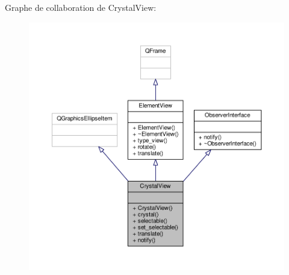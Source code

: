 Graphe de collaboration de Crystal\+View\+:
\nopagebreak
\begin{figure}[H]
\begin{center}
\leavevmode
\includegraphics[width=350pt]{d0/d09/classCrystalView__coll__graph}
\end{center}
\end{figure}
